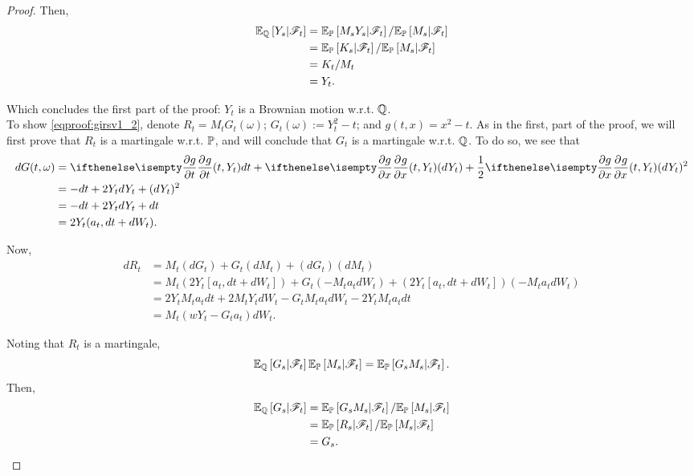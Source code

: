 \documentclass[../TGMAFFIRO.tex]{subfiles}
\begin{document}
\begin{proof}
Then,
\begin{align}
	\mathbb{E}_{\mathbb{Q}}\left[Y_s | \mathscr{F}_t\right] &= \mathbb{E}_{\mathbb{P}}\left[M_sY_s|\mathscr{F}_t\right] / \mathbb{E}_{\mathbb{P}}\left[M_s|\mathscr{F}_t\right] \nonumber\\
	&=\mathbb{E}_{\mathbb{P}}\left[K_s|\mathscr{F}_t\right] / \mathbb{E}_{\mathbb{P}}\left[M_s|\mathscr{F}_t\right] \nonumber\\
	&= K_t / M_t \nonumber \\
	&= Y_t. \label{eqproof:girsv1_3}
\end{align}

Which concludes the first part of the proof: $Y_t$ is a Brownian motion w.r.t. $\mathbb{Q}$.\\

To show \ref{eqproof:girsv1_2}, denote $R_t = M_tG_t(\omega)$; $G_t(\omega) := Y_t^2 -t$; and $g(t,x) = x^2- t$. As in the first, part of the proof, we will first prove that $R_t$ is a martingale w.r.t. $\mathbb{P}$, and will conclude that $G_t$ is a martingale w.r.t. $\mathbb{Q}$. To do so, we see that
\begin{align}
	dG(t,\omega) &= \partialwrt{g}{t}{(t,Y_t)} dt + \partialwrt{g}{x}{(t,Y_t)} (dY_t) + \frac{1}{2}\partialwrt{g}{x}{(t,Y_t)}(dY_t)^2\nonumber\\
	&= -dt + 2Y_t dY_t + (dY_t) ^2 \nonumber \\
	&= -dt + 2Y_t dY_t + dt \nonumber \\
	&= 2Y_t(a_t, dt + dW_t).
\end{align}

Now,
\begin{align}
	dR_t &= M_t (dG_t) + G_t (dM_t) + (dG_t)(dM_t)\nonumber\\
		&= M_t(2Y_t[a_t, dt + dW_t]) + G_t(-M_ta_tdW_t) + (2Y_t[a_t, dt + dW_t])(-M_ta_tdW_t) \nonumber\\
		&= 2Y_tM_ta_tdt + 2M_tY_tdW_t - G_tM_ta_tdW_t - 2Y_tM_ta_tdt \nonumber\\
		&= M_t(wY_t - G_ta_t)dW_t.
\end{align}

Noting that $R_t$ is a martingale, 
\begin{equation}
	\mathbb{E}_{\mathbb{Q}}\left[G_s | \mathscr{F}_t\right] \mathbb{E}_{\mathbb{P}}\left[M_s|\mathscr{F}_t\right] = \mathbb{E}_{\mathbb{P}}\left[G_sM_s|\mathscr{F}_t\right].
\end{equation}
Then,
\begin{align}
	\mathbb{E}_{\mathbb{Q}}\left[G_s | \mathscr{F}_t\right] &= \mathbb{E}_{\mathbb{P}}\left[G_sM_s|\mathscr{F}_t\right] / \mathbb{E}_{\mathbb{P}}\left[M_s|\mathscr{F}_t\right]\nonumber\\
	&= \mathbb{E}_{\mathbb{P}}\left[R_s|\mathscr{F}_t\right] / \mathbb{E}_{\mathbb{P}}\left[M_s|\mathscr{F}_t\right]\nonumber\\
	&= G_s.
\end{align}
\end{proof}
\end{document}
